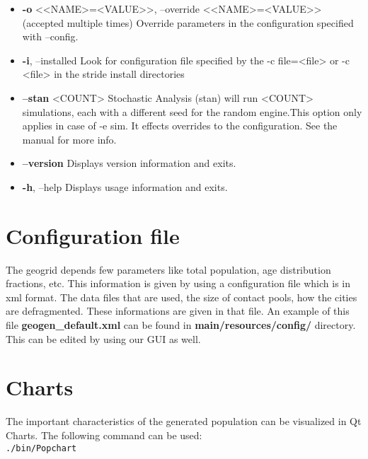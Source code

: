 \documentclass[a4paper]{article}
\begin{document}
\begin{itemize}
   \item \textbf{-o} <<NAME>=<VALUE>>,  --override <<NAME>=<VALUE>>  (accepted multiple
      times)
     Override parameters in the configuration specified with --config.

   \item \textbf{-i},  --installed
     Look for configuration file specified by the -c file=<file> or -c
     <file> in the stride install directories

   \item \textbf{--stan} <COUNT>
     Stochastic Analysis (stan) will run <COUNT> simulations, each with a
     different seed for the random engine.This option only applies in case
     of -e sim. It effects overrides to the configuration. See the manual
     for more info.

   \item\textbf{--version}
     Displays version information and exits.

   \item\textbf{-h},  --help
     Displays usage information and exits. 
     
\end{itemize}

\newpage
\section{Configuration file}
The geogrid depends few parameters like total population, age distribution fractions, etc. This information is given by using a configuration file which is in xml format. The data files that are used, the size of contact pools, how the cities are defragmented. These informations are given in that file. An example of this file \textbf{geogen\_default.xml} can be found in \textbf{main/resources/config/} directory.\\
This can be edited by using our GUI as well.


\section{Charts}
The important characteristics of the generated population can be visualized in Qt Charts. The following command can be used:\\

\verb|./bin/Popchart|\\ \\
\end{document}
